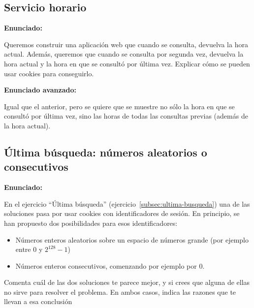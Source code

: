 \subsection{Servicio horario}
\label{subsec:ej-servicio-horario}

\textbf{Enunciado:}

Queremos construir una aplicación web que cuando se consulta, devuelva la hora actual. Además, queremos que cuando se consulta por segunda vez, devuelva la hora actual y la hora en que se consultó por última vez. Explicar cómo se pueden usar cookies para conseguirlo.

\textbf{Enunciado avanzado:}

Igual que el anterior, pero se quiere que se muestre no sólo la hora en que se consultó por última vez, sino las horas de todas las consultas previas (además de la hora actual).

\subsection{Última búsqueda: números aleatorios o consecutivos}
\label{subsec:ultima-busqueda-aleconsec}

\textbf{Enunciado:}

En el ejercicio ``Última búsqueda'' (ejercicio~\ref{subsec:ultima-busqueda}) una de las soluciones pasa por usar cookies con identificadores de sesión. En principio, se han propuesto dos posibilidades para esos identificadores:

\begin{itemize}
\item Números enteros aleatorios sobre un espacio de números grande (por ejemplo entre 0 y $2^{128}-1$)
\item Números enteros consecutivos, comenzando por ejemplo por 0.
\end{itemize}

Comenta cuál de las dos soluciones te parece mejor, y si crees que alguna de ellas no sirve para resolver el problema. En ambos casos, indica las razones que te llevan a esa conclusión


